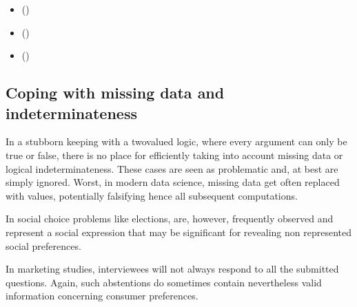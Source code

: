 \documentclass[a4paper,12pt,english]{sphinxhowto}
\begin{document}
\begin{sphinxcontents}
\begin{itemize}
\item {} 
\sphinxAtStartPar
{}\label{\detokenize{pearls:id174}}{\hyperref[\detokenize{pearls:bipolar-valued-kernel-membership-characteristic-vectors}]{}} ()

\item {} 
\sphinxAtStartPar
{}\label{\detokenize{pearls:id175}}{\hyperref[\detokenize{pearls:on-characterizing-bipolar-valued-outranking-digraphs}]{}} ()

\item {} 
\sphinxAtStartPar
{}\label{\detokenize{pearls:id176}}{\hyperref[\detokenize{pearls:consensus-quality-of-the-bipolar-valued-outranking-relation}]{}} ()

\end{itemize}
\end{sphinxcontents}


\subsection{Coping with missing data and indeterminateness}
\label{\detokenize{pearls:coping-with-missing-data-and-indeterminateness}}\label{\detokenize{pearls:copingmissing-data-label}}
\sphinxAtStartPar
In a stubborn keeping with a two\sphinxhyphen{}valued logic, where every argument can only be true or false, there is no place for efficiently taking into account missing data or logical indeterminateness. These cases are seen as problematic and, at best are simply ignored. Worst, in modern data science, missing data get often replaced with  values, potentially falsifying hence all subsequent computations.

\sphinxAtStartPar
In social choice problems like elections,  are, however, frequently observed and represent a social expression that may be significant for revealing non represented social preferences.

\sphinxAtStartPar
In marketing studies, interviewees will not always respond to all the submitted questions. Again, such abstentions do sometimes contain nevertheless valid information concerning consumer preferences.
\end{document}
